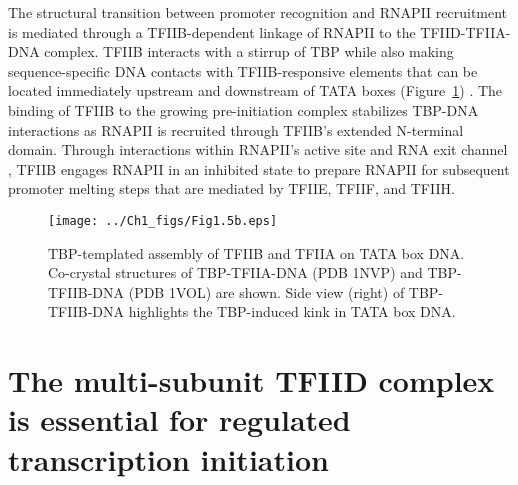 \indent The structural transition between promoter recognition and RNAPII recruitment is mediated through a TFIIB-dependent linkage of RNAPII to the TFIID-TFIIA-DNA complex. TFIIB interacts with a stirrup of TBP while also making sequence-specific DNA contacts with TFIIB-responsive elements that can be located immediately upstream and downstream of TATA boxes (Figure~\ref{fig:Fig1.5}) \cite{Lagrange_2618, Nikolov_3177}. The binding of TFIIB to the growing pre-initiation complex stabilizes TBP-DNA interactions as RNAPII is recruited through TFIIB's extended N-terminal domain. Through interactions within RNAPII's active site and RNA exit channel \cite{Kostrewa_659}, TFIIB engages RNAPII in an inhibited state to prepare RNAPII for subsequent promoter melting steps that are mediated by TFIIE, TFIIF, and TFIIH. \\
\begin{figure}
\centering
\texttt{[image: ../Ch1\_figs/Fig1.5b.eps]}
\caption[TBP-templated assembly of TFIIB and TFIIA on TATA box DNA]{TBP-templated assembly of TFIIB and TFIIA on TATA box DNA. Co-crystal structures of TBP-TFIIA-DNA (PDB 1NVP) \cite{Bleichenbacher_2003} and TBP-TFIIB-DNA (PDB 1VOL) \cite{Nikolov_3177} are shown.  Side view (right) of TBP-TFIIB-DNA highlights the TBP-induced kink in TATA box DNA.}
\label{fig:Fig1.5}
\end{figure}


\section{The multi-subunit TFIID complex is essential for regulated transcription initiation}

